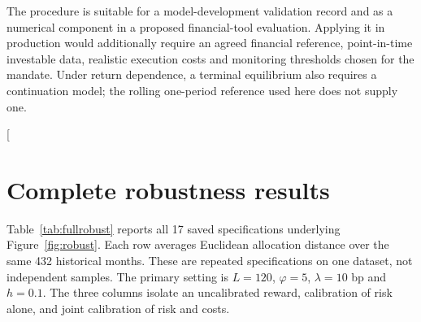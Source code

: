 \documentclass[sigconf,anonymous,review]{acmart}
\begin{document}
The procedure is suitable for a model-development validation record and as a numerical component in a proposed financial-tool evaluation. Applying it in production would additionally require an agreed financial reference, point-in-time investable data, realistic execution costs and monitoring thresholds chosen for the mandate. Under return dependence, a terminal equilibrium also requires a continuation model; the rolling one-period reference used here does not supply one.



\appendix
\twocolumn[{
\section{Complete robustness results}\label{app:robustness}
Table~\ref{tab:fullrobust} reports all 17 saved specifications underlying Figure~\ref{fig:robust}. Each row averages Euclidean allocation distance over the same 432 historical months. These are repeated specifications on one dataset, not independent samples. The primary setting is $L=120$, $\varphi=5$, $\lambda=10$ bp and $h=0.1$. The three columns isolate an uncalibrated reward, calibration of risk alone, and joint calibration of risk and costs.

}
\end{document}
